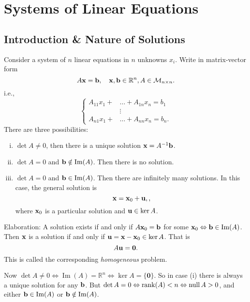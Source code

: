 \documentclass[10pt]{article}
\DeclareMathOperator{\im}{Im}
\DeclareMathOperator{\nullity}{null}
\begin{document}
    \section{Systems of Linear Equations}
    \subsection{Introduction \& Nature of Solutions}
    Consider a system of $n$ linear equations in $n$ unknowns $x_i$. Write in matrix-vector form
    \[
        A{\bf x}={\bf b},\quad {\bf x},{\bf b}\in \mathbb{R}^{n}, A\in {\mathcal{M}}_{n\times n}
    .\]
    i.e.,
    \[
        \left\lbrace\begin{aligned}
            A_{11} x_{1}+&\ldots+A_{1 n} x_{n}=b_{1} \\
            &\vdots\\
            A_{n 1} x_{1}+&\ldots+A_{n n} x_{n}=b_{n}.
        \end{aligned}\right.
    \]
    There are three possibilities:
    \begin{enumerate}[(i)]
        \item $ \det A\neq 0 $, then there is a unique solution $ {\bf x}=A^{-1}{\bf b} $.
        \item $ \det A=0 $ and $ \bfb\notin \im(A) $. Then there is no solution.
        \item $ \det A=0  $ and $ \bfb\in \im(A) $. Then there are infinitely many solutions. In this case, the general solution is 
        \[
            {\bf x}={\bf x}_0+{\bf u},
        ,\]
        where ${\bf x}_0$ is a particular solution and ${\bf u}\in \ker A$.
    \end{enumerate}
    Elaboration: A solution exists if and only if $ A{\bf x}_0={\bf b} $ for some $ \bfx_0 \Leftrightarrow \bfb\in \im(A) $. Then ${\bf x}$ is a solution if and only if ${\bf u}={\bf x}-{\bf x}_0\in \ker A$. That is 
    \[
        A{\bf u}=\mathbf{0}
    .\]
    This is called the corresponding \textit{homogeneous} problem.
    
    Now $ \det A\neq 0 \Leftrightarrow \im(A)=\mathbb{R}^{n} \Leftrightarrow \ker A=\{\mathbf{0}\} $. So in case (i) there is always a unique solution for any ${\bf b}$. But $ \det A=0 \Leftrightarrow \rank(A)<n \Leftrightarrow \nullity A>0 $, and either $\bfb\in \im(A)$ or $\bfb\notin\im(A)$.
\end{document}
